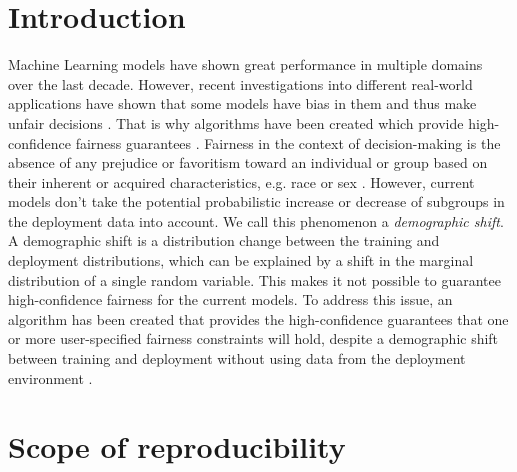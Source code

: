 \section{Introduction}
Machine Learning models have shown great performance in multiple domains over the last decade. However, recent investigations into different real-world applications have shown that some models have bias in them and thus make unfair decisions \cite{mehrabi2021survey}. That is why algorithms have been created which provide high-confidence fairness guarantees \cite{agarwal2018, thomas2019}. Fairness in the context of decision-making is the absence of any prejudice or favoritism toward an individual or group based on their inherent or acquired characteristics, e.g. race or sex \cite{mehrabi2021survey}. However, current models don't take the potential probabilistic increase or decrease of subgroups in the deployment data into account. We call this phenomenon a \textit{demographic shift}. A demographic shift is a distribution change between the training and deployment distributions, which can be explained by a shift in the marginal distribution of a single random variable. This makes it not possible to guarantee high-confidence fairness for the current models. 
\newline
\newline
To address this issue, an algorithm has been created that provides the high-confidence guarantees that one or more user-specified fairness constraints will hold, despite a demographic shift between training and deployment without using data from the deployment environment \cite{giguere2022}. 



\section{Scope of reproducibility}
\label{sec:claims}

